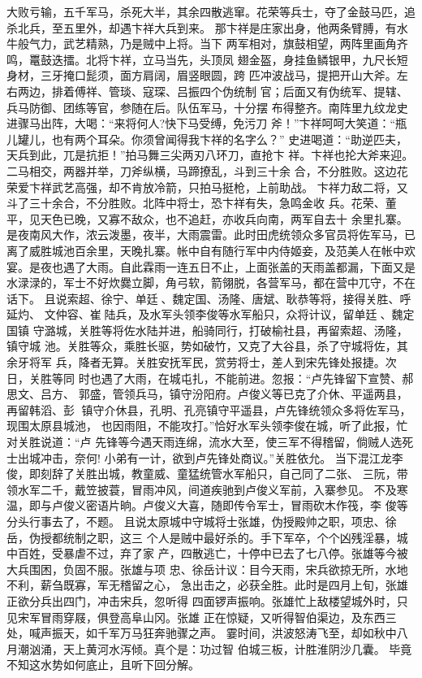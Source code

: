 大败亏输，五千军马，杀死大半，其余四散逃窜。花荣等兵士，夺了金鼓马匹，追
杀北兵，至五里外，却遇卞祥大兵到来。
那卞祥是庄家出身，他两条臂膊，有水牛般气力，武艺精熟，乃是贼中上将。当下
两军相对，旗鼓相望，两阵里画角齐鸣，鼍鼓迭擂。北将卞祥，立马当先，头顶凤
翅金盔，身挂鱼鳞银甲，九尺长短身材，三牙掩口髭须，面方肩阔，眉竖眼圆，跨
匹冲波战马，提把开山大斧。左右两边，排着傅祥、管琰、寇琛、吕振四个伪统制
官；后面又有伪统军、提辖、兵马防御、团练等官，参随在后。队伍军马，十分摆
布得整齐。南阵里九纹龙史进骤马出阵，大喝：“来将何人?快下马受缚，免污刀
斧！”卞祥呵呵大笑道：“瓶儿罐儿，也有两个耳朵。你须曾闻得我卞祥的名字么？”
史进喝道：“助逆匹夫，天兵到此，兀是抗拒！”拍马舞三尖两刃八环刀，直抢卞
祥。卞祥也抡大斧来迎。二马相交，两器并举，刀斧纵横，马蹄撩乱，斗到三十余
合，不分胜败。这边花荣爱卞祥武艺高强，却不肯放冷箭，只拍马挺枪，上前助战。
卞祥力敌二将，又斗了三十余合，不分胜败。北阵中将士，恐卞祥有失，急鸣金收
兵。花荣、董平，见天色已晚，又寡不敌众，也不追赶，亦收兵向南，两军自去十
余里扎寨。
是夜南风大作，浓云泼墨，夜半，大雨震雷。此时田虎统领众多官员将佐军马，已
离了威胜城池百余里，天晚扎寨。帐中自有随行军中内侍姬妾，及范美人在帐中欢
宴。是夜也遇了大雨。自此霖雨一连五日不止，上面张盖的天雨盖都漏，下面又是
水渌渌的，军士不好炊爨立脚，角弓软，箭翎脱，各营军马，都在营中兀守，不在
话下。
且说索超、徐宁、单廷、魏定国、汤隆、唐斌、耿恭等将，接得关胜、呼延灼、
文仲容、崔陆兵，及水军头领李俊等水军船只，众将计议，留单廷、魏定国镇
守潞城，关胜等将佐水陆并进，船骑同行，打破榆社县，再留索超、汤隆，镇守城
池。关胜等众，乘胜长驱，势如破竹，又克了大谷县，杀了守城将佐，其余牙将军
兵，降者无算。关胜安抚军民，赏劳将士，差人到宋先锋处报捷。次日，关胜等同
时也遇了大雨，在城屯扎，不能前进。忽报：“卢先锋留下宣赞、郝思文、吕方、
郭盛，管领兵马，镇守汾阳府。卢俊义等已克了介休、平遥两县，再留韩滔、彭
镇守介休县，孔明、孔亮镇守平遥县，卢先锋统领众多将佐军马，现围太原县城池，
也因雨阻，不能攻打。”恰好水军头领李俊在城，听了此报，忙对关胜说道：“卢
先锋等今遇天雨连绵，流水大至，使三军不得稽留，倘贼人选死士出城冲击，奈何!
小弟有一计，欲到卢先锋处商议。”关胜依允。
当下混江龙李俊，即刻辞了关胜出城，教童威、童猛统管水军船只，自己同了二张、
三阮，带领水军二千，戴笠披蓑，冒雨冲风，间道疾驰到卢俊义军前，入寨参见。
不及寒温，即与卢俊义密语片晌。卢俊义大喜，随即传令军士，冒雨砍木作筏，李
俊等分头行事去了，不题。
且说太原城中守城将士张雄，伪授殿帅之职，项忠、徐岳，伪授都统制之职，这三
个人是贼中最好杀的。手下军卒，个个凶残淫暴，城中百姓，受暴虐不过，弃了家
产，四散逃亡，十停中已去了七八停。张雄等今被大兵围困，负固不服。张雄与项
忠、徐岳计议：目今天雨，宋兵欲掠无所，水地不利，薪刍既寡，军无稽留之心，
急出击之，必获全胜。此时是四月上旬，张雄正欲分兵出四门，冲击宋兵，忽听得
四面锣声振响。张雄忙上敌楼望城外时，只见宋军冒雨穿屐，俱登高阜山冈。张雄
正在惊疑，又听得智伯渠边，及东西三处，喊声振天，如千军万马狂奔驰骤之声。
霎时间，洪波怒涛飞至，却如秋中八月潮汹涌，天上黄河水泻倾。真个是：功过智
伯城三板，计胜淮阴沙几囊。
毕竟不知这水势如何底止，且听下回分解。